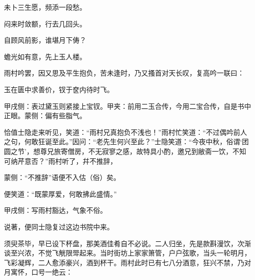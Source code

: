 \begin{poem}
    \begin{pl}未卜三生愿，频添一段愁。\end{pl}

    \begin{pl}闷来时敛额，行去几回头。\end{pl}

    \begin{pl}自顾风前影，谁堪月下俦？\end{pl}

    \begin{pl}蟾光如有意，先上玉人楼。\end{pl}
\end{poem}


\begin{parag}
    雨村吟罢，因又思及平生抱负，苦未逢时，乃又搔首对天长叹，复高吟一联曰：
\end{parag}


\begin{poem}
    \begin{pl}玉在匮中求善价，钗于奁内待时飞。\begin{note}甲戌侧：表过黛玉则紧接上宝钗。甲夹：前用二玉合传，今用二宝合传，自是书中正眼。蒙侧：偏有些脂气。\end{note}\end{pl}\end{poem}


\begin{parag}
    恰值士隐走来听见，笑道：“雨村兄真抱负不浅也！”雨村忙笑道：“不过偶吟前人之句，何敢狂诞至此。”因问：“老先生何兴至此？”士隐笑道：“今夜中秋，俗谓‘团圆之节’，想尊兄旅寄僧房，不无寂寥之感，故特具小酌，邀兄到敝斋一饮，不知可纳芹意否？”雨村听了，幷不推辞，\begin{note}蒙侧：“不推辞”语便不入估（俗）矣。\end{note}便笑道：“既蒙厚爱，何敢拂此盛情。”\begin{note}甲戌侧：写雨村豁达，气象不俗。\end{note}说著，便同士隐复过这边书院中来。
\end{parag}


\begin{parag}
    须臾茶毕，早已设下杯盘，那美酒佳肴自不必说。二人归坐，先是款斟漫饮，次渐谈至兴浓，不觉飞觥限斝起来。当时街坊上家家箫管，户户弦歌，当头一轮明月，飞彩凝辉，二人愈添豪兴，酒到杯干。雨村此时已有七八分酒意，狂兴不禁，乃对月寓怀，口号一绝云：
\end{parag}


